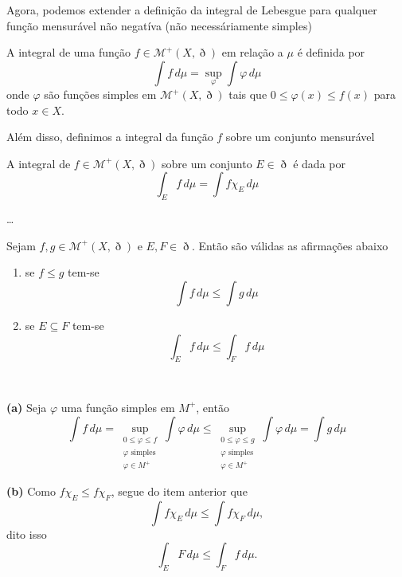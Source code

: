 \documentclass[a4paper, 11pt]{book}
\theoremstyle{definition}
\newcommand{\cM}{\mathcal{M}}
\begin{document}
Agora, podemos extender a definição da integral de Lebesgue para qualquer função mensurável não negatíva (não necessáriamente simples)

\begin{dbox}
    A integral de uma função $f \in \cM^+(X,\eth)$ em relação a $\mu$ é definida por
    \[
        \int f \, d\mu = \sup_\varphi \int \varphi \, d\mu
    \]
    onde $\varphi$ são funções simples em $\mathcal{M}^+(X,\eth)$ tais que $0 \leqslant \varphi(x) \leqslant f(x)$ para todo $x \in X$.
\end{dbox}

Além disso, definimos a integral da função $f$ sobre um conjunto mensurável

\begin{dbox}
    A integral de $f \in \cM^+(X,\eth)$ sobre um conjunto $E \in \eth$ é dada por
    \[
        \int_E f \, d\mu = \int f \chi_E \, d\mu
    \]
\end{dbox}

\dots

\begin{lbox} \label{lm:propiedades-integral-nao-negativa}
    Sejam $f, g \in \cM^+(X,\eth)$ e $E, F \in \eth$.
    Então são válidas as afirmações abaixo
    \begin{enumerate}[leftmargin=*, label=\textbf{(\alph*)}]
        \item se $f \leqslant g$ tem-se
        \[
            \int f \, d\mu \leqslant \int g \, d\mu
        \]
        \item se $E \subseteq F$ tem-se
        \[
            \int_E f \, d\mu \leqslant \int_F f \, d\mu
        \]
    \end{enumerate}
\end{lbox}
\begin{prf}
    ~

    \textbf{(a)} Seja $\varphi$ uma função simples em $M^+$, então
    \[
        \int f \, d\mu = \sup_{\substack{0 \leqslant \varphi \leqslant f \\ \varphi \text{ simples} \\ \varphi \in M^+}} \int \varphi \, d \mu \leqslant \sup_{\substack{0 \leqslant \varphi \leqslant g \\ \varphi \text{ simples} \\ \varphi \in M^+}} \int \varphi \, d \mu = \int g \, d\mu
    \]

    \textbf{(b)} Como $f \chi_E \leqslant f \chi_F$, segue do item anterior que
    \[
        \int f \chi_E \, d\mu \leqslant \int f \chi_F \, d\mu,
    \]
    dito isso
    \[
        \int_E F \, d \mu \leqslant \int_F f \, d\mu.
    \]
\end{prf}
\end{document}
